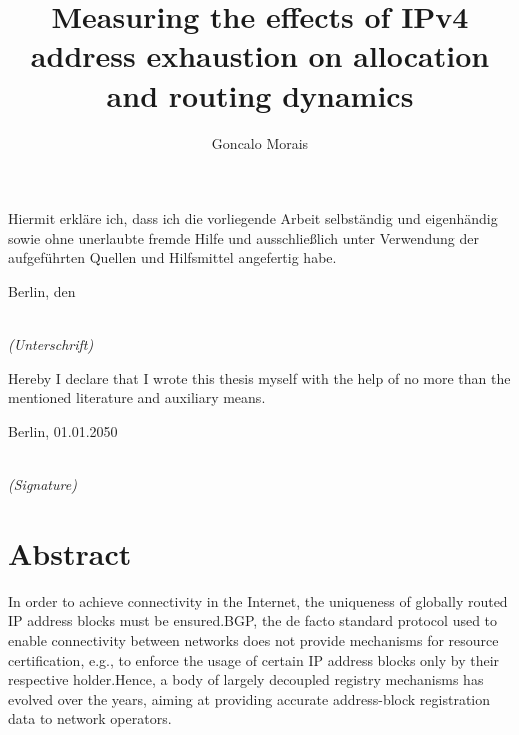 \documentclass[11pt,a4paper]{scrreprt}
\title{\textbf{Measuring the effects of IPv4 address exhaustion on allocation and routing dynamics}}
\author{Goncalo Morais}
\date{}
\begin{document}
\maketitle

\setcounter{chapter}{0}
\clearpage
\begin{large}

\vspace*{6cm}

\noindent
Hiermit erkl\"{a}re ich, dass ich die vorliegende Arbeit selbst\"{a}ndig und eigenh\"{a}ndig sowie ohne unerlaubte fremde Hilfe und ausschlie\ss lich unter Verwendung der aufgef\"{u}hrten Quellen und Hilfsmittel angefertig habe.
\vspace{2cm}

\noindent
Berlin, den

\vspace{3cm}

\hspace*{7cm}%
\dotfill\\
\hspace*{8.5cm}%
\textit{(Unterschrift)}

\end{large}

\clearpage

\begin{large}

\vspace*{6cm}

\noindent
Hereby I declare that I wrote this thesis myself with the help of no more than the mentioned literature and auxiliary means.
\vspace{2cm}

\noindent
Berlin, 01.01.2050

\vspace{3cm}

\hspace*{7cm}%
\dotfill\\
\hspace*{8.5cm}%
\textit{(Signature)}

\end{large}
\chapter*{Abstract}

In order to achieve connectivity in the Internet, the uniqueness of
globally routed IP address blocks must be ensured.BGP, the de facto
standard protocol used to enable connectivity between networks does not
provide mechanisms for resource certification, e.g., to enforce the
usage of certain IP address blocks only by their respective holder.Hence, a body of largely decoupled registry mechanisms has evolved over
the years, aiming at providing accurate address-block registration data
to network operators.
\end{document}
